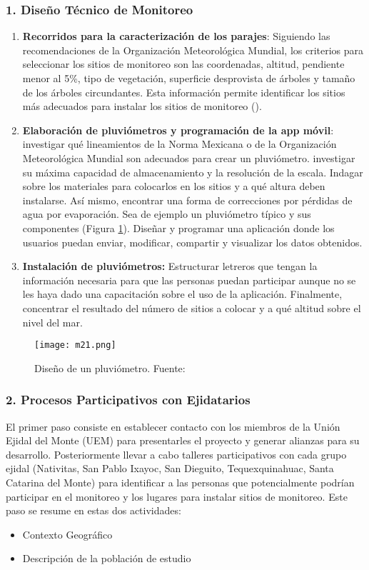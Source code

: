 \subsubsection{1. Diseño Técnico de Monitoreo}
\begin{enumerate}
    \item \textbf{Recorridos para la caracterización de los parajes}: Siguiendo las recomendaciones de la Organización Meteorológica Mundial, los criterios para seleccionar los sitios de monitoreo son las coordenadas, altitud, pendiente menor al 5\%, tipo de vegetación, superficie desprovista de árboles y tamaño de los árboles circundantes. Esta información permite identificar los sitios más adecuados para instalar los sitios de monitoreo (\cite{WMO2014}). 
 
    \item \textbf{Elaboración de pluviómetros y programación de la app móvil}: investigar qué lineamientos de la Norma Mexicana o de la Organización Meteorológica Mundial son adecuados para crear un pluviómetro. investigar su máxima capacidad de almacenamiento y la resolución de la escala. Indagar sobre los materiales para colocarlos en los sitios y a qué altura deben instalarse. Así mismo, encontrar una forma de correcciones por pérdidas de agua por evaporación. Sea de ejemplo un pluviómetro típico y sus componentes (Figura \ref{m21}). Diseñar y programar una aplicación donde los usuarios puedan enviar, modificar, compartir y visualizar los datos obtenidos.

    \item \textbf{Instalación de pluviómetros:} Estructurar letreros que tengan la información necesaria para que las personas puedan participar aunque no se les haya dado una capacitación sobre el uso de la aplicación. Finalmente, concentrar el resultado del número de sitios a colocar y a qué altitud sobre el nivel del mar. 
\end{enumerate}


\begin{figure}[h!]
\centering
  \texttt{[image: m21.png]}
  \caption{Diseño de un pluviómetro. Fuente: \cite{WMO2014} }
  \label{m21}
\end{figure}

 


\subsubsection{2. Procesos Participativos con Ejidatarios} 
El primer paso consiste en establecer contacto con los miembros de la Unión Ejidal del Monte (UEM) para presentarles el proyecto y generar alianzas para su desarrollo. Posteriormente llevar a cabo talleres participativos con cada grupo ejidal (Nativitas, San Pablo Ixayoc, San Dieguito, Tequexquinahuac, Santa Catarina del Monte) para identificar a las personas que potencialmente podrían participar en el monitoreo y los lugares para instalar sitios de monitoreo. Este paso se resume en estas dos actividades:
\begin{itemize}
  \item Contexto Geográfico
  \item Descripción de la población de estudio
\end{itemize}


